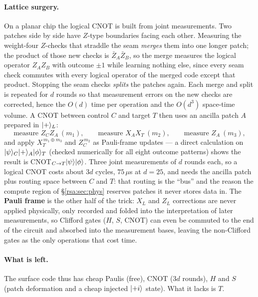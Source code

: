 \paragraph{Lattice surgery.} On a planar chip the logical CNOT is built from joint
measurements. Two patches side by side have $Z$-type boundaries facing each other. Measuring the
weight-four $Z$-checks that straddle the seam \emph{merges} them into one longer patch; the
product of those new checks is $\bar Z_A\bar Z_B$, so the merge measures the logical operator
$Z_AZ_B$ with outcome $\pm1$ while learning nothing else, since every seam check commutes with
every logical operator of the merged code except that product. Stopping the seam checks
\emph{splits} the patches again. Each merge and split is repeated for $d$ rounds so that
measurement errors on the new checks are corrected, hence the $O(d)$ time per operation and the
$O(d^3)$ space-time volume. A CNOT between control $C$ and target $T$ then uses an ancilla patch
$A$ prepared in $\lvert + \rangle_L$:
\[ \text{measure }Z_CZ_A\ (m_1),\qquad \text{measure }X_AX_T\ (m_2),\qquad
   \text{measure }Z_A\ (m_3), \]
and apply $X_T^{\,m_1\oplus m_3}$ and $Z_C^{\,m_2}$ as Pauli-frame updates --- a direct calculation on
$\lvert \psi \rangle_C\lvert + \rangle_A\lvert \phi \rangle_T$ (checked numerically for all eight outcome patterns) shows the result
is CNOT$_{C\to T}\lvert \psi \rangle\lvert \phi \rangle$. Three joint
measurements of $d$ rounds each, so a logical CNOT costs about $3d$ cycles, $75\,\mu$s at $d=25$,
and needs the ancilla patch plus routing space between $C$ and $T$: that routing is the ``bus''
and the reason the compute region of \S\ref{rsa:sec:phys} reserves patches it never stores
data in. The \textbf{Pauli frame} is the other half of the trick: $X_L$ and $Z_L$ corrections
are never applied physically, only recorded and folded into the interpretation of later
measurements, so Clifford gates ($H$, $S$, CNOT) can even be commuted to the end of the circuit and
absorbed into the measurement bases, leaving the non-Clifford gates as the only operations that
cost time.

\paragraph{What is left.} The surface code thus has cheap Paulis (free), CNOT ($3d$ rounds),
$H$ and $S$ (patch deformation and a cheap injected $\lvert +i \rangle$ state). What it lacks is $T$.

